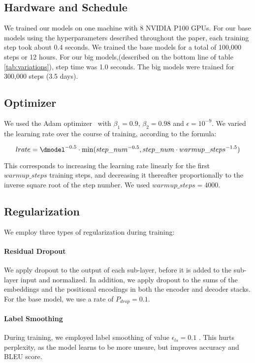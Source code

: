 \subsection{Hardware and Schedule}

We trained our models on one machine with 8 NVIDIA P100 GPUs.  For our base models using the hyperparameters described throughout the paper, each training step took about 0.4 seconds.  We trained the base models for a total of 100,000 steps or 12 hours.  For our big models,(described on the bottom line of table \ref{tab:variations}), step time was 1.0 seconds.  The big models were trained for 300,000 steps (3.5 days).

\subsection{Optimizer} We used the Adam optimizer~\citep{kingma2014adam} with $\beta_1=0.9$, $\beta_2=0.98$ and $\epsilon=10^{-9}$.  We varied the learning rate over the course of training, according to the formula:

\begin{equation}
lrate = \dmodel^{-0.5} \cdot
  \min({step\_num}^{-0.5},
    {step\_num} \cdot {warmup\_steps}^{-1.5})
\end{equation}

This corresponds to increasing the learning rate linearly for the first $warmup\_steps$ training steps, and decreasing it thereafter proportionally to the inverse square root of the step number.  We used $warmup\_steps=4000$.

\subsection{Regularization} \label{sec:reg}

We employ three types of regularization during training: 
\paragraph{Residual Dropout} We apply dropout \citep{srivastava2014dropout} to the output of each sub-layer, before it is added to the sub-layer input and normalized.   In addition, we apply dropout to the sums of the embeddings and the positional encodings in both the encoder and decoder stacks.  For the base model, we use a rate of $P_{drop}=0.1$.

\paragraph{Label Smoothing} During training, we employed label smoothing of value $\epsilon_{ls}=0.1$ \citep{DBLP:journals/corr/SzegedyVISW15}.  This hurts perplexity, as the model learns to be more unsure, but improves accuracy and BLEU score.


